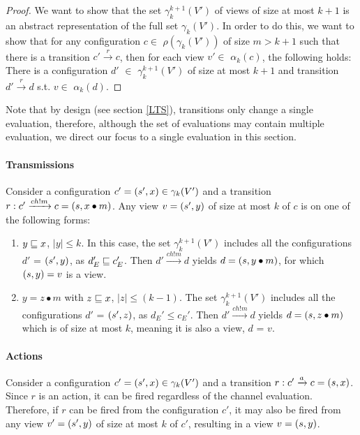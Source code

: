\begin{proof}
We want to show that the set $\gamma_k^{k+1}(V')$ of views of size at most $k+1$ is an abstract representation of the full set $\gamma_k(V')$. In order to do this, 
we want to show that for any configuration $c \in$ $\rho(\gamma_k(V'))$ of size $m > k + 1$ such that there is a transition  $c' \xrightarrow{r} c$, then for each view $v' \in$ $\alpha_k(c)$, the following holds: There is a configuration $d'$ $\in$ $\gamma_k^{k+1}(V')$ of size at most $k+1$ and transition $ d' \xrightarrow{r} d$ s.t. $v \in$ $\alpha_k(d)$.
\end{proof}

Note that by design (see section \ref{LTS}), transitions only change a single evaluation, therefore, although the set of evaluations may contain multiple evaluation, we direct our focus to a single evaluation in this section.

\paragraph{Transmissions}
\label{proofTransmission}
Consider a configuration $c' = (s', x) \in \gamma_k(V')$ and a transition $r: c' \xrightarrow{ch!m} c = (s,x \bullet m)$. Any view $v = (s', y)$ of size at most $k$ of $c$ is on one of the following forms:

\begin{enumerate}
\item
$y \sqsubseteq x$, $|y| \leq k$. In this case, the set $\gamma_k^{k+1}(V')$ includes all the configurations $d'$ = $(s', y)$, as $d_E' \sqsubseteq c_E'$. Then $d' \xrightarrow{ch!m} d$ yields $d = (s, y\bullet m)$, for which $(s, y) = v$ is a view.
\item
$y = z\bullet m$ with $z \sqsubseteq x$, $|z| \leq (k-1)$. The set $\gamma_k^{k+1}(V')$ includes all the configurations $d'$ = $(s', z)$, as $d_E' \leq c_E'$. Then $d' \xrightarrow{ch!m} d$ yields $d = (s, z\bullet m)$ which is of size at most $k$, meaning it is also a view, $d$ = $v$.
\end{enumerate}


\paragraph{Actions}
Consider a configuration $c' = (s', x) \in \gamma_k(V')$ and a transition $r: c' \xrightarrow{a} c = (s, x)$. Since $r$ is an action, it can be fired regardless of the channel evaluation. Therefore, if $r$ can be fired from the configuration $c'$, it may also be fired from any view $v' = (s', y)$ of size at most $k$ of $c'$, resulting in a view $v =  (s, y)$.

